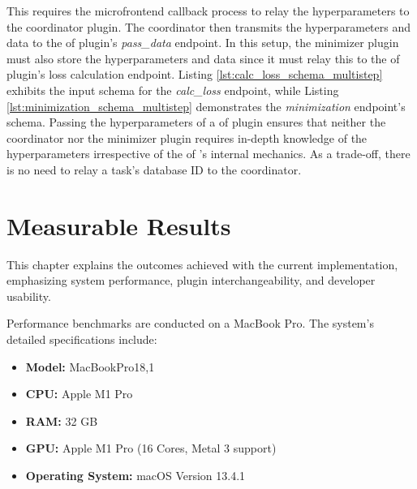 \documentclass[
  a4paper,  %
  twoside,  %
  bibliography=totoc,
  headsepline,
  cleardoublepage=empty,
  parskip=half,
  draft=false
]{scrbook}
\begin{document}
This requires the microfrontend callback process to relay the hyperparameters to the coordinator plugin.
The coordinator then transmits the hyperparameters and data to the \gls{of} plugin's \emph{pass\_data} endpoint.
In this setup, the minimizer plugin must also store the hyperparameters and data since it must relay this to the \gls{of} plugin's loss calculation endpoint.
Listing \ref{lst:calc_loss_schema_multistep} exhibits the input schema for the \emph{calc\_loss} endpoint, while Listing \ref{lst:minimization_schema_multistep} demonstrates the \emph{minimization} endpoint's schema.
Passing the hyperparameters of a \gls{of} plugin ensures that neither the coordinator nor the minimizer plugin requires in-depth knowledge of the hyperparameters irrespective of the \gls{of} 's internal mechanics.
As a trade-off, there is no need to relay a task's database ID to the coordinator.

\noindent\begin{minipage}{\linewidth}
  
\end{minipage}

\noindent\begin{minipage}{\linewidth}
  
\end{minipage}


\chapter{Measurable Results}
\label{chap:results}

This chapter explains the outcomes achieved with the current implementation, emphasizing system performance, plugin interchangeability, and developer usability.

Performance benchmarks are conducted on a MacBook Pro. The system's detailed specifications include:

\begin{itemize}
    \item \textbf{Model:} MacBookPro18,1
    \item \textbf{CPU:} Apple M1 Pro
    \item \textbf{RAM:} 32 GB
    \item \textbf{GPU:} Apple M1 Pro (16 Cores, Metal 3 support)
    \item \textbf{Operating System:} macOS Version 13.4.1
\end{itemize}
\end{document}
